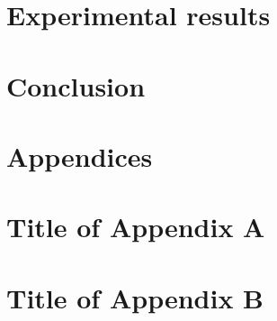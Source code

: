 \documentclass{article}
\begin{document}

\section{Experimental results}
\label{sec:results}




\section{Conclusion}
\label{sec:conclusion}



\newpage
\section{Appendices}

\appendix
\section{Title of Appendix A}
\section{Title of Appendix B}



\end{document}
